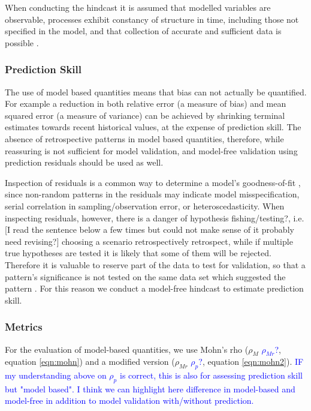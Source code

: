 \documentclass[12pt,halfline,a4paper,nonumbib]{ouparticle}
\newcommand{\toshi}{\textcolor{blue}}
\begin{document}
When conducting the hindcast it is assumed that modelled variables are observable, processes exhibit constancy of structure in time, including those not specified in the model, and that collection of accurate and sufficient data is possible \parencite{hodges1992you}.

\subsubsection{Prediction Skill}


The use of model based quantities means that bias can not actually be quantified. For example a reduction in both relative error (a measure of bias) and mean squared error (a measure of variance) can be achieved by shrinking terminal estimates towards recent historical values, at the expense of prediction skill. The absence of retrospective patterns in model based quantities, therefore, while reassuring is not sufficient for model validation, and model-free validation using prediction residuals should be used as well.

Inspection of residuals is a common way to determine a model’s goodness-of-fit \parencite{cox1968general}, since  non-random patterns in the residuals may indicate model misspecification, serial correlation in sampling/observation error, or heteroscedasticity. When inspecting residuals, however, there is a danger of hypothesis fishing/testing?, i.e. [I read the sentence below a few times but could not make sense of it probably need revising?] choosing a scenario retrospectively retrospect, while if multiple true hypotheses are tested it is likely that some of them will be rejected. Therefore it is valuable to reserve part of the data to test for validation, so that a pattern’s significance is not tested on the same data set which suggested the pattern \parencite{thygesen2017validation}. For this reason we conduct a model-free hindcast to estimate prediction skill.

\subsubsection{Metrics}

For the evaluation of model-based quantities, we use Mohn's rho ($\rho_M$ \toshi{$\rho_{Mr}$?}, equation \ref{eqn:mohn}) and a modified version ($\rho_{Mr}$ \toshi{$\rho_{p}$?}, equation \ref{eqn:mohn2}). \toshi{IF my understanding above on $\rho_{p}$ is correct, this is also for assessing prediction skill but "model based". I think we can highlight here difference in model-based and model-free in addition to model validation with/without prediction.}
\end{document}
